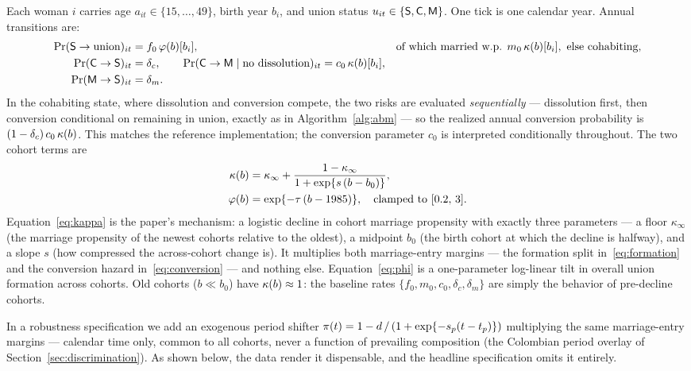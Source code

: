 Each woman $i$ carries age $a_{it} \in \{15,\dots,49\}$, birth year $b_i$, and
union status $u_{it} \in \{\mathsf{S}, \mathsf{C}, \mathsf{M}\}$. One tick is one calendar year.
Annual transitions are:
\begin{align}
\Pr(\mathsf{S} \to \text{union})_{it} &= f_0 \,\varphi(b)[b_i],
  &&\text{of which married w.p. } m_0\,\kappa(b)[b_i], \text{ else cohabiting},
  \label{eq:formation}\\
\Pr(\mathsf{C} \to \mathsf{S})_{it} &= \delta_c, \qquad
\Pr(\mathsf{C} \to \mathsf{M} \mid \text{no dissolution})_{it} = c_0 \,\kappa(b)[b_i],
  \label{eq:conversion}\\
\Pr(\mathsf{M} \to \mathsf{S})_{it} &= \delta_m.
  \label{eq:dissolution}
\end{align}
In the cohabiting state, where dissolution and conversion compete, the two
risks are evaluated \emph{sequentially} --- dissolution first, then conversion
conditional on remaining in union, exactly as in Algorithm~\ref{alg:abm} ---
so the realized annual conversion probability is
$(1-\delta_c)\,c_0\,\kappa(b)$. This matches the reference implementation; the
conversion parameter $c_0$ is interpreted conditionally throughout.
The two cohort terms are
\begin{align}
\kappa(b) &= \kappa_\infty + \frac{1-\kappa_\infty}{1+\exp\{s\,(b-b_0)\}},
  \label{eq:kappa}\\
\varphi(b) &= \exp\{-\tau\,(b-1985)\}, \quad \text{clamped to } [0.2,\,3].
  \label{eq:phi}
\end{align}
Equation~\eqref{eq:kappa} is the paper's mechanism: a logistic decline in
cohort marriage propensity with exactly three parameters --- a floor
$\kappa_\infty$ (the marriage propensity of the newest cohorts relative to the
oldest), a midpoint $b_0$ (the birth cohort at which the decline is halfway),
and a slope $s$ (how compressed the across-cohort change is). It multiplies
both marriage-entry margins --- the formation split in~\eqref{eq:formation} and
the conversion hazard in~\eqref{eq:conversion} --- and nothing else.
Equation~\eqref{eq:phi} is a one-parameter log-linear tilt in overall union
formation across cohorts. Old cohorts ($b \ll b_0$) have $\kappa(b) \approx 1$: the
baseline rates $\{f_0, m_0, c_0, \delta_c, \delta_m\}$ are simply the behavior
of pre-decline cohorts.

In a robustness specification we add an exogenous period shifter
$\pi(t) = 1 - d\,/\,(1+\exp\{-s_p (t - t_p)\})$ multiplying the same
marriage-entry margins --- calendar time only, common to all cohorts, never a
function of prevailing composition (the Colombian period overlay of
Section~\ref{sec:discrimination}). As shown below, the data render it
dispensable, and the headline specification omits it entirely.

